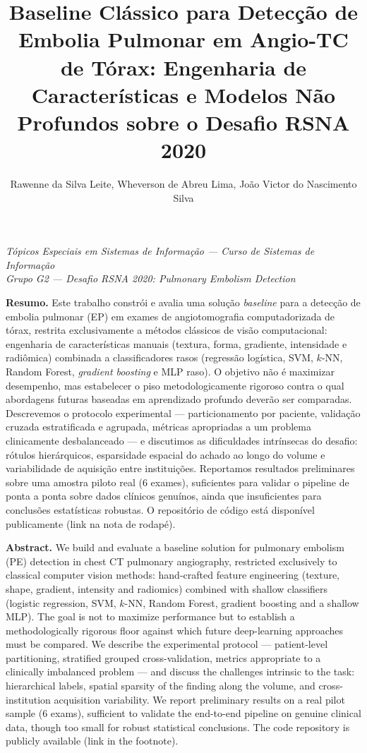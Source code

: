 \documentclass[12pt,a4paper]{article}
\title{\textbf{Baseline Clássico para Detecção de Embolia Pulmonar em Angio-TC de Tórax: Engenharia de Características e Modelos Não Profundos sobre o Desafio RSNA 2020}}
\author{
Rawenne da Silva Leite, Wheverson de Abreu Lima, João Victor do Nascimento Silva
}
\date{}
\begin{document}
\maketitle
\thispagestyle{empty}

\begin{center}
\small
\textit{Tópicos Especiais em Sistemas de Informação --- Curso de Sistemas de Informação}\\
\textit{Grupo G2 --- Desafio RSNA 2020: Pulmonary Embolism Detection}
\end{center}

\vspace{0.3cm}

\noindent\textbf{Resumo.} Este trabalho constrói e avalia uma solução \emph{baseline}
para a detecção de embolia pulmonar (EP) em exames de angiotomografia computadorizada
de tórax, restrita exclusivamente a métodos clássicos de visão computacional:
engenharia de características manuais (textura, forma, gradiente, intensidade e
radiômica) combinada a classificadores rasos (regressão logística, SVM, $k$-NN,
Random Forest, \emph{gradient boosting} e MLP raso). O objetivo não é maximizar
desempenho, mas estabelecer o piso metodologicamente rigoroso contra o qual
abordagens futuras baseadas em aprendizado profundo deverão ser comparadas.
Descrevemos o protocolo experimental --- particionamento por paciente, validação
cruzada estratificada e agrupada, métricas apropriadas a um problema clinicamente
desbalanceado --- e discutimos as dificuldades intrínsecas do desafio: rótulos
hierárquicos, esparsidade espacial do achado ao longo do volume e variabilidade de
aquisição entre instituições. Reportamos resultados preliminares sobre uma amostra
piloto real (6 exames), suficientes para validar o pipeline de ponta a ponta sobre
dados clínicos genuínos, ainda que insuficientes para conclusões estatísticas
robustas. O repositório de código está disponível publicamente (link na nota de
rodapé).

\vspace{0.2cm}

\noindent\textbf{Abstract.} We build and evaluate a baseline solution for pulmonary
embolism (PE) detection in chest CT pulmonary angiography, restricted exclusively to
classical computer vision methods: hand-crafted feature engineering (texture, shape,
gradient, intensity and radiomics) combined with shallow classifiers (logistic
regression, SVM, $k$-NN, Random Forest, gradient boosting and a shallow MLP). The goal
is not to maximize performance but to establish a methodologically rigorous floor
against which future deep-learning approaches must be compared. We describe the
experimental protocol --- patient-level partitioning, stratified grouped
cross-validation, metrics appropriate to a clinically imbalanced problem --- and
discuss the challenges intrinsic to the task: hierarchical labels, spatial sparsity of
the finding along the volume, and cross-institution acquisition variability. We
report preliminary results on a real pilot sample (6 exams), sufficient to validate
the end-to-end pipeline on genuine clinical data, though too small for robust
statistical conclusions. The code repository is publicly available (link in the
footnote).
\end{document}
